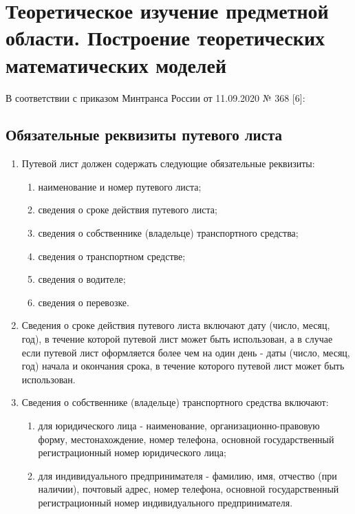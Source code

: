\documentclass[../nirs.tex]{subfiles}
\begin{document}
\section{Теоретическое изучение предметной области. Построение теоретических
математических моделей}

В соответствии с приказом Минтранса России от 11.09.2020 № 368  [6]:

\subsection{Обязательные реквизиты путевого листа}
\begin{enumerate}
	\item Путевой лист должен содержать следующие обязательные реквизиты:

	\begin{enumerate}
		\item наименование и номер путевого листа;
		\item сведения о сроке действия путевого листа;
		\item сведения о собственнике (владельце) транспортного средства;
		\item сведения о транспортном средстве;
		\item сведения о водителе;
		\item сведения о перевозке.
	\end{enumerate}

	\item Сведения о сроке действия путевого листа включают дату (число, месяц,
		год), в течение которой путевой лист может быть использован, а в случае
		если путевой лист оформляется более чем на один день - даты (число,
		месяц, год) начала и окончания срока, в течение которого путевой лист
		может быть использован.
	\item Сведения о собственнике (владельце) транспортного средства включают:

	\begin{enumerate}
		\item для юридического лица - наименование, организационно-правовую
			форму, местонахождение, номер телефона, основной государственный
			регистрационный номер юридического лица;
		\item для индивидуального предпринимателя - фамилию, имя, отчество (при
			наличии), почтовый адрес, номер телефона, основной государственный
			регистрационный номер индивидуального предпринимателя.
	\end{enumerate}


\end{enumerate}
\end{document}
